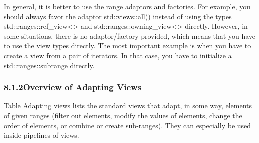 In general, it is better to use the range adaptors and factories. For example, you should always favor the adaptor std::views::all() instead of using the types std::ranges::ref\_view<> and std::ranges::owning\_view<> directly. However, in some situations, there is no adaptor/factory provided, which means that you have to use the view types directly. The most important example is when you have to create a view from a pair of iterators. In that case, you have to initialize a std::ranges::subrange directly.

\subsubsection*{ 8.1.2\hspace{0.2cm}Overview of Adapting Views}

Table Adapting views lists the standard views that adapt, in some way, elements of given ranges (filter out elements, modify the values of elements, change the order of elements, or combine or create sub-ranges). They can especially be used inside pipelines of views.


